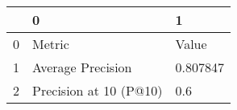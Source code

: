 \begin{tabular}{lll}
\toprule
{} &                       0 &         1 \\
\midrule
0 &                  Metric &     Value \\
1 &       Average Precision &  0.807847 \\
2 &  Precision at 10 (P@10) &       0.6 \\
\bottomrule
\end{tabular}
